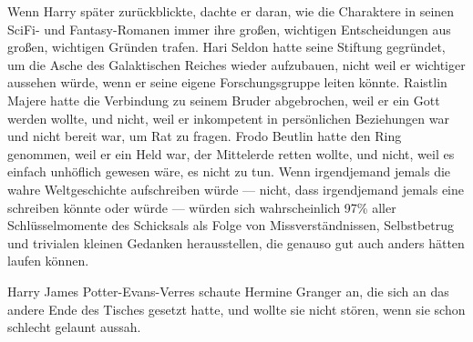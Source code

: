 Wenn Harry später zurückblickte, dachte er daran, wie die Charaktere in seinen SciFi- und Fantasy-Romanen immer ihre großen, wichtigen Entscheidungen aus großen, wichtigen Gründen trafen. Hari Seldon hatte seine Stiftung gegründet, um die Asche des Galaktischen Reiches wieder aufzubauen, nicht weil er wichtiger aussehen würde, wenn er seine eigene Forschungsgruppe leiten könnte. Raistlin Majere hatte die Verbindung zu seinem Bruder abgebrochen, weil er ein Gott werden wollte, und nicht, weil er inkompetent in persönlichen Beziehungen war und nicht bereit war, um Rat zu fragen. Frodo Beutlin hatte den Ring genommen, weil er ein Held war, der Mittelerde retten wollte, und nicht, weil es einfach unhöflich gewesen wäre, es nicht zu tun. Wenn irgendjemand jemals die wahre Weltgeschichte aufschreiben würde — nicht, dass irgendjemand jemals eine schreiben könnte oder würde — würden sich wahrscheinlich 97\% aller Schlüsselmomente des Schicksals als Folge von Missverständnissen, Selbstbetrug und trivialen kleinen Gedanken herausstellen, die genauso gut auch anders hätten laufen können.%

Harry James Potter-Evans-Verres schaute Hermine Granger an, die sich an das andere Ende des Tisches gesetzt hatte, und wollte sie nicht stören, wenn sie schon schlecht gelaunt aussah.

